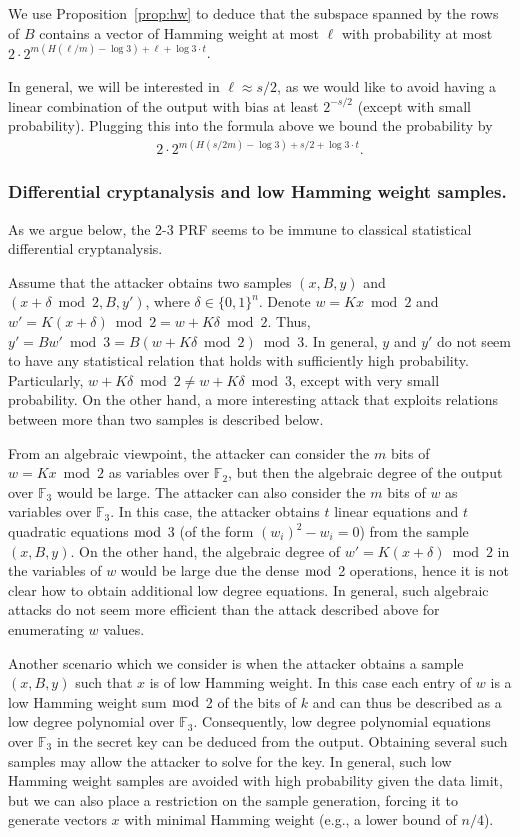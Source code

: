 \documentclass[orivec,envcountsect]{llncs}
\begin{document}
We use Proposition~\ref{prop:hw} to deduce
that the subspace spanned by the rows of $B$ contains a vector of Hamming weight at most $\ell$ with probability at most
$2 \cdot 2^{m (H(\ell/m) - \log 3) + \ell + \log 3 \cdot t}$.

In general, we will be interested in $\ell \approx s/2$,
as we would like to avoid having a linear combination of the output with bias at least $2^{-s/2}$
(except with small probability).
Plugging this into the formula above we bound the probability by
\begin{align}
\label{eq:bias}
2 \cdot 2^{m (H(s/2m) - \log 3) + s/2 + \log 3 \cdot t}.
\end{align}

\subsubsection{Differential cryptanalysis and low Hamming weight samples.}
As we argue below, the 2-3 PRF seems to be immune to classical statistical differential cryptanalysis.

Assume that the attacker obtains two samples $(x,B,y)$ and $(x+\delta \bmod 2,B,y')$, where $\delta \in \{0,1\}^n$.
Denote $w = K x \bmod 2$ and $w' = K (x + \delta) \bmod 2 = w + K \delta \bmod 2$.
Thus, $y' = B w' \bmod 3 = B (w + K \delta \bmod 2 ) \bmod 3$.
In general, $y$ and $y'$ do not seem to have any statistical relation that holds with sufficiently high probability.
Particularly, $w + K \delta \bmod 2 \neq w + K \delta \bmod 3$,
except with very small probability.
On the other hand, a more interesting attack that exploits relations between more than two samples is described below.

From an algebraic viewpoint, the attacker can consider the $m$ bits of $w = K x \bmod 2$ as variables over $\mathbb{F}_2$,
but then the algebraic degree of the output over $\mathbb{F}_3$ would be large.
The attacker can also consider the $m$ bits of $w$ as variables over $\mathbb{F}_3$.
In this case, the attacker obtains $t$ linear equations and $t$ quadratic equations $\bmod$ 3 (of the form $(w_i)^2 - w_i = 0$) from the sample $(x,B,y)$.
On the other hand, the algebraic degree of $w' = K (x +\delta) \bmod 2$ in the variables of $w$ would be large due the dense $\bmod$ 2 operations,
hence it is not clear how to obtain additional low degree equations.
In general, such algebraic attacks do not seem more efficient than the attack described above for enumerating $w$ values.

Another scenario which we consider is when the attacker obtains a sample $(x,B,y)$
such that $x$ is of low Hamming weight. In this case each entry of $w$ is a low Hamming weight sum $\bmod$ 2
of the bits of $k$ and can thus be described as a low degree polynomial over $\mathbb{F}_3$.
Consequently, low degree polynomial equations over $\mathbb{F}_3$ in the secret key can be deduced from the output.
Obtaining several such samples may allow the attacker to solve for the key.
In general, such low Hamming weight samples are avoided with high probability given the data limit,
but we can also place a restriction on the sample generation, forcing it to generate vectors $x$
with minimal Hamming weight (e.g., a lower bound of $n/4$).
\end{document}
